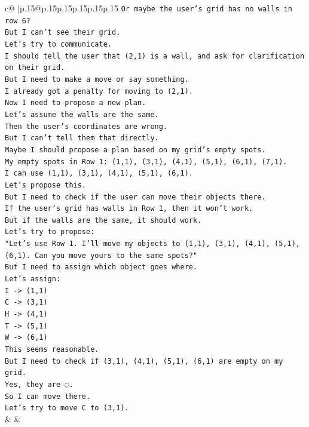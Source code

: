 \documentclass{article}
\begin{document}
{\begin{supertabular}{c@{$\;$}|p{.15\linewidth}@{}p{.15\linewidth}p{.15\linewidth}p{.15\linewidth}p{.15\linewidth}p{.15\linewidth}}
{{{\texttt{Or maybe the user's grid has no walls in row 6?} \\
\texttt{But I can't see their grid.} \\
\texttt{Let's try to communicate.} \\
\texttt{I should tell the user that (2,1) is a wall, and ask for clarification on their grid.} \\
\texttt{But I need to make a move or say something.} \\
\texttt{I already got a penalty for moving to (2,1).} \\
\texttt{Now I need to propose a new plan.} \\
\texttt{Let's assume the walls are the same.} \\
\texttt{Then the user's coordinates are wrong.} \\
\texttt{But I can't tell them that directly.} \\
\texttt{Maybe I should propose a plan based on my grid's empty spots.} \\
\texttt{My empty spots in Row 1: (1,1), (3,1), (4,1), (5,1), (6,1), (7,1).} \\
\texttt{I can use (1,1), (3,1), (4,1), (5,1), (6,1).} \\
\texttt{Let's propose this.} \\
\texttt{But I need to check if the user can move their objects there.} \\
\texttt{If the user's grid has walls in Row 1, then it won't work.} \\
\texttt{But if the walls are the same, it should work.} \\
\texttt{Let's try to propose:} \\
\texttt{"Let's use Row 1. I'll move my objects to (1,1), (3,1), (4,1), (5,1), (6,1). Can you move yours to the same spots?"} \\
\texttt{But I need to assign which object goes where.} \\
\texttt{Let's assign:} \\
\texttt{I {-}> (1,1)} \\
\texttt{C {-}> (3,1)} \\
\texttt{H {-}> (4,1)} \\
\texttt{T {-}> (5,1)} \\
\texttt{W {-}> (6,1)} \\
\texttt{This seems reasonable.} \\
\texttt{But I need to check if (3,1), (4,1), (5,1), (6,1) are empty on my grid.} \\
\texttt{Yes, they are ◌.} \\
\texttt{So I can move there.} \\
\texttt{Let's try to move C to (3,1).} \\
            }
        }
    }
    & & \\ \\


\end{supertabular}}
\end{document}
